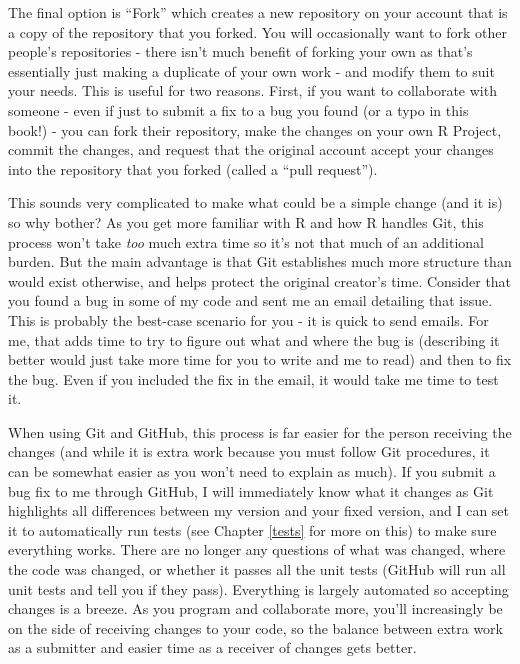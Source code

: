 \documentclass[
  a4paper,
]{krantz}
\begin{document}
The final option is ``Fork'' which creates a new repository
on your account that is a copy of the repository that you
forked. You will occasionally want to fork other people's
repositories - there isn't much benefit of forking your own
as that's essentially just making a duplicate of your own
work - and modify them to suit your needs. This is useful
for two reasons. First, if you want to collaborate with
someone - even if just to submit a fix to a bug you found
(or a typo in this book!) - you can fork their repository,
make the changes on your own R Project, commit the changes,
and request that the original account accept your changes
into the repository that you forked (called a ``pull
request'').

This sounds very complicated to make what could be a simple
change (and it is) so why bother? As you get more familiar
with R and how R handles Git, this process won't take
\emph{too} much extra time so it's not that much of an
additional burden. But the main advantage is that Git
establishes much more structure than would exist otherwise,
and helps protect the original creator's time. Consider that
you found a bug in some of my code and sent me an email
detailing that issue. This is probably the best-case
scenario for you - it is quick to send emails. For me, that
adds time to try to figure out what and where the bug is
(describing it better would just take more time for you to
write and me to read) and then to fix the bug. Even if you
included the fix in the email, it would take me time to test
it.

When using Git and GitHub, this process is far easier for
the person receiving the changes (and while it is extra work
because you must follow Git procedures, it can be somewhat
easier as you won't need to explain as much). If you submit
a bug fix to me through GitHub, I will immediately know what
it changes as Git highlights all differences between my
version and your fixed version, and I can set it to
automatically run tests (see Chapter \ref{tests} for more on
this) to make sure everything works. There are no longer any
questions of what was changed, where the code was changed,
or whether it passes all the unit tests (GitHub will run all
unit tests and tell you if they pass). Everything is largely
automated so accepting changes is a breeze. As you program
and collaborate more, you'll increasingly be on the side of
receiving changes to your code, so the balance between extra
work as a submitter and easier time as a receiver of changes
gets better.
\end{document}

